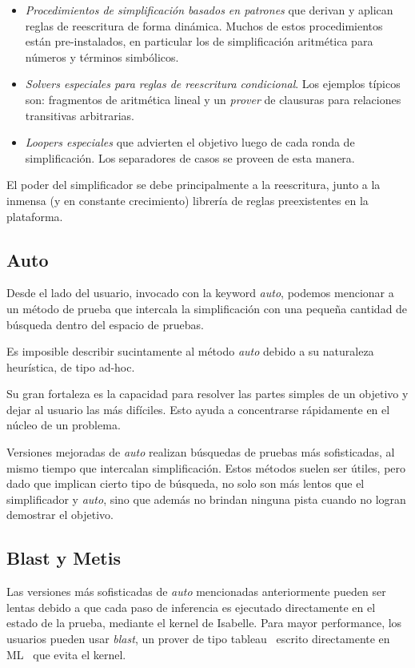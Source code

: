 \documentclass[12pt]{book}
\begin{document}
\begin{itemize}
	\item \textit{Procedimientos de simplificación basados en patrones} que derivan y aplican reglas de reescritura de forma dinámica. Muchos de estos procedimientos están pre-instalados, en particular los de simplificación aritmética para números y términos simbólicos.
	\item \textit{Solvers especiales para reglas de reescritura condicional}. Los ejemplos típicos son: fragmentos de aritmética lineal y un \textit{prover} de clausuras para relaciones transitivas arbitrarias.
	\item \textit{\textit{Loopers} especiales} que advierten el objetivo luego de cada ronda de simplificación. Los separadores de casos se proveen de esta manera.
\end{itemize}

El poder del simplificador se debe principalmente a la reescritura, junto a la inmensa (y en constante crecimiento) librería de reglas preexistentes en la plataforma.


\subsection{Auto}\label{ssec:auto}

Desde el lado del usuario, invocado con la keyword \textit{auto}, podemos mencionar a un método de prueba que intercala la simplificación con una pequeña cantidad de búsqueda dentro del espacio de pruebas.

Es imposible describir sucintamente al método \textit{auto} debido a su naturaleza heurística, de tipo ad-hoc.

Su gran fortaleza es la capacidad para resolver las partes simples de un objetivo y dejar al usuario las más difíciles. Esto ayuda a concentrarse rápidamente en el núcleo de un problema.

Versiones mejoradas de \textit{auto} realizan búsquedas de pruebas más sofisticadas, al mismo tiempo que intercalan simplificación. Estos métodos suelen ser útiles, pero dado que implican cierto tipo de búsqueda, no solo son más lentos que el simplificador y \textit{auto}, sino que además no brindan ninguna pista cuando no logran demostrar el objetivo.


\subsection{Blast y Metis}
Las versiones más sofisticadas de \textit{auto} mencionadas anteriormente pueden ser lentas debido a que cada paso de inferencia es ejecutado directamente en el estado de la prueba, mediante el kernel de Isabelle.
Para mayor performance, los usuarios pueden usar \textit{blast}, un prover de tipo tableau~\cite{tableau_provers} escrito directamente en ML~\cite{ML_programming_language} que evita el kernel.
\end{document}
